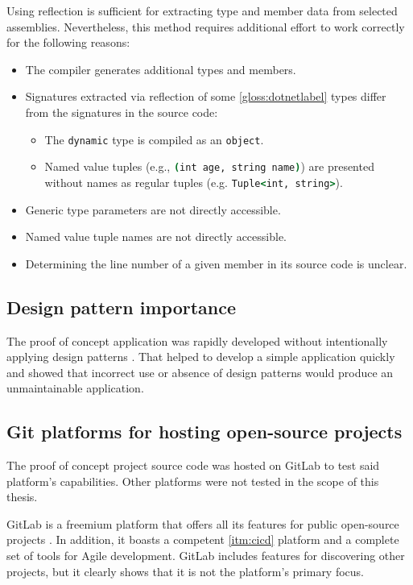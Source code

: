 Using reflection is sufficient for extracting type and member data from selected assemblies. Nevertheless, this method requires additional effort to work correctly for the following reasons:
\begin{itemize}
    \item The compiler generates additional types and members.
    \item Signatures extracted via reflection of some \ref{gloss:dotnetlabel} types differ from the signatures in the source code:
    \begin{itemize}
        \item The \lstinline[language=csh]{dynamic} type is compiled as an \lstinline[language=csh]{object}.
        \item Named value tuples (e.g., \lstinline[language=csh]{(int age, string name)}) are presented without names as regular tuples (e.g. \lstinline[language=csh]{Tuple<int, string>}).
    \end{itemize}
    \item Generic type parameters are not directly accessible.
    \item Named value tuple names are not directly accessible.
    \item Determining the line number of a given member in its source code is unclear.
\end{itemize}

\subsection{Design pattern importance}

The proof of concept application was rapidly developed without intentionally applying design patterns \cite{humblot_design_2021}. That helped to develop a simple application quickly and showed that incorrect use or absence of design patterns would produce an unmaintainable application.

\subsection{Git platforms for hosting open-source projects}

The proof of concept project source code was hosted on GitLab to test said platform's capabilities. Other platforms were not tested in the scope of this thesis.

GitLab is a freemium platform that offers all its features for public open-source projects \cite{gumster_6_2018}. In addition, it boasts a competent \ref{itm:cicd} platform and a complete set of tools for Agile development. GitLab includes features for discovering other projects, but it clearly shows that it is not the platform's primary focus.

